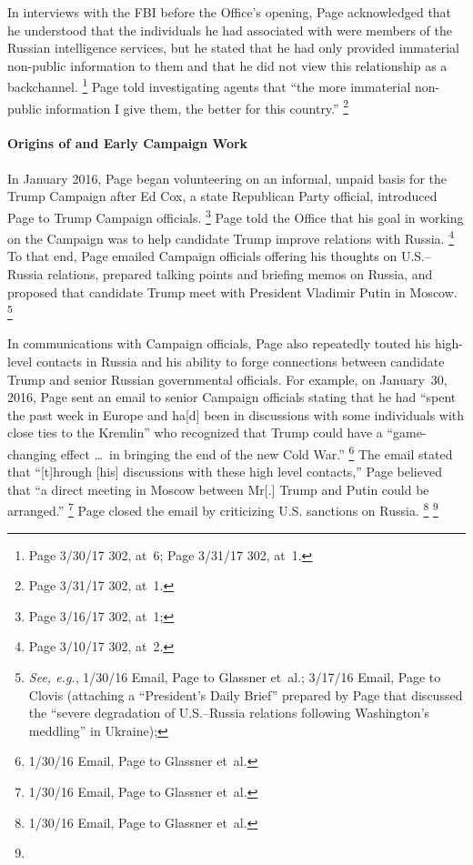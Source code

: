 In interviews with the FBI before the Office's opening, Page acknowledged that he understood that the individuals he had associated with were members of the Russian intelligence services, but he stated that he had only provided immaterial non-public information to them and that he did not view this relationship as a backchannel.%
\footnote{Page 3/30/17 302, at~6; Page 3/31/17 302, at~1.}
Page told investigating agents that ``the more immaterial non-public information I give them, the better for this country.''%
\footnote{Page 3/31/17 302, at~1.}

\paragraph{Origins of and Early Campaign Work}

In January 2016, Page began volunteering on an informal, unpaid basis for the Trump Campaign after Ed Cox, a state Republican Party official, introduced Page to Trump Campaign officials.%
\footnote{Page 3/16/17 302, at~1; }
Page told the Office that his goal in working on the Campaign was to help candidate Trump improve relations with Russia.%
\footnote{Page 3/10/17 302, at~2.}
To that end, Page emailed Campaign officials offering his thoughts on U.S.--Russia relations, prepared talking points and briefing memos on Russia, and proposed that candidate Trump meet with President Vladimir Putin in Moscow.%
\footnote{\textit{See, e.g.}, 1/30/16 Email, Page to Glassner et~al.;
3/17/16 Email, Page to Clovis (attaching a ``President's Daily Brief\thinspace'' prepared by Page that discussed the ``severe degradation of U.S.--Russia relations following Washington's meddling'' in Ukraine); }

In communications with Campaign officials, Page also repeatedly touted his high-level contacts in Russia and his ability to forge connections between candidate Trump and senior Russian governmental officials.
For example, on January~30, 2016, Page sent an email to senior Campaign officials stating that he had ``spent the past week in Europe and ha[d] been in discussions with some individuals with close ties to the Kremlin'' who recognized that Trump could have a ``game-changing effect \dots\ in bringing the end of the new Cold War.''%
\footnote{1/30/16 Email, Page to Glassner et~al.}
The email stated that ``[t]hrough [his] discussions with these high level contacts,'' Page believed that ``a direct meeting in Moscow between Mr[.] Trump and Putin could be arranged.''%
\footnote{1/30/16 Email, Page to Glassner et~al.}
Page closed the email by criticizing U.S. sanctions on Russia.%
\footnote{1/30/16 Email, Page to Glassner et~al.}
\footnote{}

